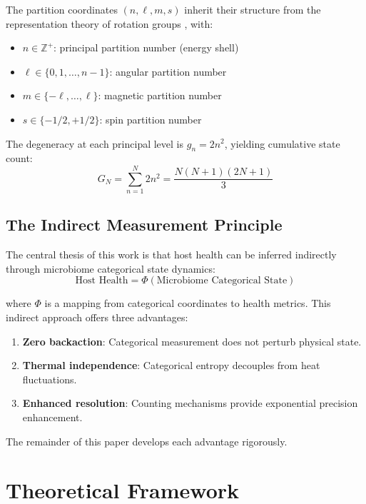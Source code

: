 \documentclass[twocolumn,10pt]{article}
\begin{document}
The partition coordinates $(n, \ell, m, s)$ inherit their structure from the representation theory of rotation groups \cite{hall2015}, with:
\begin{itemize}
    \item $n \in \mathbb{Z}^+$: principal partition number (energy shell)
    \item $\ell \in \{0, 1, \ldots, n-1\}$: angular partition number
    \item $m \in \{-\ell, \ldots, \ell\}$: magnetic partition number
    \item $s \in \{-1/2, +1/2\}$: spin partition number
\end{itemize}

The degeneracy at each principal level is $g_n = 2n^2$, yielding cumulative state count:
\begin{equation}
    G_N = \sum_{n=1}^{N} 2n^2 = \frac{N(N+1)(2N+1)}{3}
    \label{eq:cumulative_states}
\end{equation}

\subsection{The Indirect Measurement Principle}

The central thesis of this work is that host health can be inferred indirectly through microbiome categorical state dynamics:
\begin{equation}
    \text{Host Health} = \Phi(\text{Microbiome Categorical State})
    \label{eq:indirect_principle}
\end{equation}

where $\Phi$ is a mapping from categorical coordinates to health metrics. This indirect approach offers three advantages:

\begin{enumerate}
    \item \textbf{Zero backaction}: Categorical measurement does not perturb physical state.
    \item \textbf{Thermal independence}: Categorical entropy decouples from heat fluctuations.
    \item \textbf{Enhanced resolution}: Counting mechanisms provide exponential precision enhancement.
\end{enumerate}

The remainder of this paper develops each advantage rigorously.

\section{Theoretical Framework}
\end{document}
